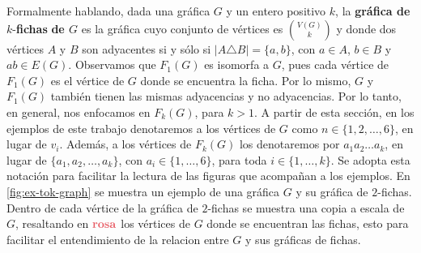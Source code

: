 Formalmente hablando, dada una gr\'afica $G$ y un entero positivo $k$, la
\textbf{gr\'afica de} $k$-\textbf{fichas} 
\textbf{de $G$} es la gr\'afica cuyo conjunto de
v\'ertices es $\binom{V(G)}{k}$ y donde dos v\'ertices $A$ y $B$ son adyacentes
si y s\'olo si $|A \triangle B| = \{a,b\}$, con $a \in A$, $b \in B$ y $ab \in
E(G)$. Observamos que $F_1(G)$ es isomorfa a $G$, pues cada v\'ertice de
$F_1(G)$ es el v\'ertice de $G$ donde se encuentra la ficha. Por lo mismo, $G$ y
$F_1(G)$ tambi\'en tienen las mismas adyacencias y no adyacencias. Por lo tanto,
en general, nos enfocamos en $F_k(G)$, para $k > 1$. A partir de esta secci\'on,
en los ejemplos de este trabajo denotaremos a los v\'ertices de $G$ como $n \in
\{1,2, \dots, 6\}$, en lugar de $v_i$. Adem\'as, a los v\'ertices de $F_k(G)$
los denotaremos por $a_1 a_2 \dots a_k$, en lugar de $\{a_1, a_2, \dots, a_k\}$,
con $a_i \in \{1, \dots, 6\}$, para toda $i \in \{1, \dots, k\}$. Se adopta esta
notaci\'on para facilitar la lectura de las figuras que acompa\~{n}an a los
ejemplos. En \cref{fig:ex-tok-graph} se muestra un ejemplo de una gr\'afica $G$
y su gr\'afica de $2$-fichas. Dentro de cada v\'ertice de la gr\'afica de
$2$-fichas se muestra una copia a escala de $G$, resaltando en ${\color{rosa}\bf
rosa}$ los v\'ertices de $G$ donde se encuentran las fichas, esto para facilitar
el entendimiento de la relacion entre $G$ y sus gr\'aficas de fichas.

